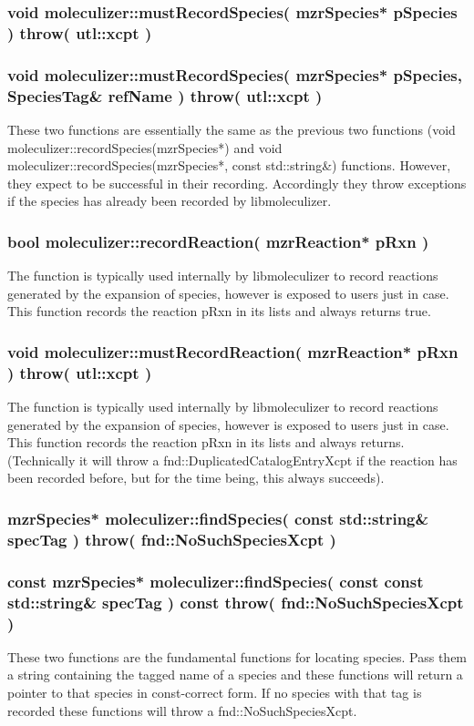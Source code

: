 \subsubsection{void moleculizer::mustRecordSpecies( mzrSpecies* pSpecies ) throw( utl::xcpt )}
\subsubsection{void moleculizer::mustRecordSpecies( mzrSpecies*
  pSpecies, SpeciesTag\& refName ) throw( utl::xcpt )}
These two functions are essentially the same as the previous two
functions (void moleculizer::recordSpecies(mzrSpecies*) and void
moleculizer::recordSpecies(mzrSpecies*, const std::string\&)
functions.  However, they expect to be successful in their recording.
Accordingly they throw exceptions if the species has already been
recorded by libmoleculizer.

\subsubsection{bool moleculizer::recordReaction( mzrReaction* pRxn
  )}
The function is typically used internally by libmoleculizer to record
reactions generated by the expansion of species, however is exposed to
users just in case.  This function records the reaction pRxn in its
lists and always returns true.  

\subsubsection{void moleculizer::mustRecordReaction( mzrReaction* pRxn ) throw( utl::xcpt )}
The function is typically used internally by libmoleculizer to record
reactions generated by the expansion of species, however is exposed to
users just in case.  This function records the reaction pRxn in its
lists and always returns.  (Technically it will throw a
fnd::DuplicatedCatalogEntryXcpt if the reaction has been recorded
before, but for the time being, this always succeeds). 
        
\subsubsection{mzrSpecies* moleculizer::findSpecies( const
  std::string\& specTag ) throw( fnd::NoSuchSpeciesXcpt )}
\subsubsection{const mzrSpecies* moleculizer::findSpecies( const
  const std::string\& specTag ) const throw( fnd::NoSuchSpeciesXcpt )}
These two functions are the fundamental functions for locating
species.  Pass them a string containing the tagged name of a species
and these functions will return a pointer to that species in
const-correct form.  If no species with that tag is recorded these
functions will throw a fnd::NoSuchSpeciesXcpt.

